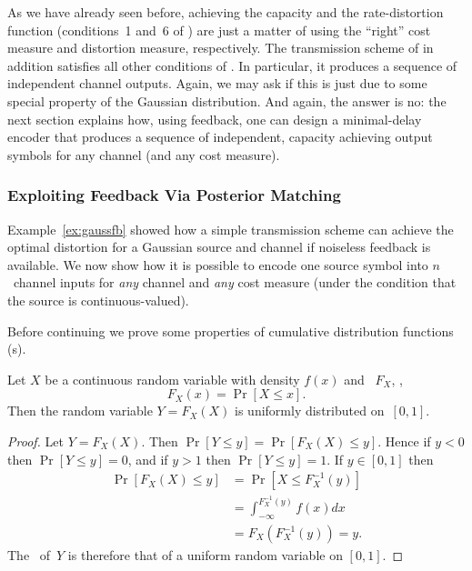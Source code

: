 As we have already seen before, achieving the capacity and the rate-distortion
function (conditions~1 and~6 of ) are just a matter
of using the ``right'' cost measure and distortion measure, respectively. The
transmission scheme of  in addition satisfies all other
conditions of . In particular, it produces a
sequence of independent channel outputs. Again, we may ask if this is just due
to some special property of the Gaussian distribution. And again, the answer is
no: the next section explains how, using feedback, one can design a
minimal-delay encoder that produces a sequence of independent, capacity
achieving output symbols for any channel (and any cost measure).


\subsubsection{Exploiting Feedback Via Posterior Matching}

Example~\ref{ex:gaussfb} showed how a simple transmission scheme can achieve the
optimal distortion for a Gaussian source and channel if noiseless feedback is
available.  We now show how it is possible to encode one source symbol into
$n$~channel inputs for \emph{any} channel and \emph{any} cost measure (under the
condition that the source is continuous-valued).

Before continuing we prove some properties of cumulative distribution functions
(\cdf s).

\begin{lemma}
  \label{lem:cdfunif}
  Let $X$ be a continuous random variable with density $f(x)$ and \cdf\ $F_X$,
  \ie,
  \begin{equation*}
    F_X(x) = \Pr[X \le x].
  \end{equation*}
  Then the random variable $Y = F_X(X)$ is uniformly distributed on~$[0,1]$.
\end{lemma}

\begin{proof}
  Let $Y = F_X(X)$. Then $\Pr[Y \le y] = \Pr[F_X(X) \le y]$.
  Hence if $y < 0$ then $\Pr[Y \le y] = 0$, and if $y > 1$ then $\Pr[Y \le y] =
  1$.  If $y \in [0,1]$ then
  \begin{align*}
    \Pr[F_X(X) \le y] &= \Pr[X \le F_X^{-1}(y)] \\
    &= \int_{-\infty}^{F_X^{-1}(y)} f(x) dx \\
    &= F_X(F_X^{-1}(y)) = y.
  \end{align*}
  The \cdf\ of~$Y$ is therefore that of a uniform random variable on $[0,1]$.
\end{proof}


